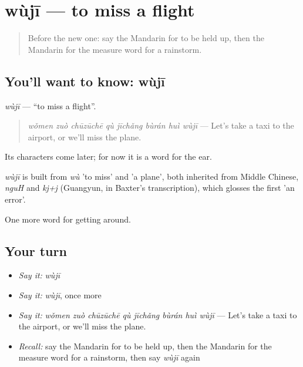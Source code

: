 \section[wùjī]{wùjī — to miss a flight}

\label{lesson:ZH-C416-wuji}



\begin{quote}
Before the new one: say the Mandarin for to be held up, then the Mandarin for the measure word for a rainstorm.
\end{quote}

\subsection*{You'll want to know: wùjī}
\emph{wùjī} — \textquotedblleft{}to miss a flight\textquotedblright{}.

\begin{quote}
\emph{wǒmen zuò chūzūchē qù jīchǎng bùrán huì wùjī} — Let's take a taxi to the airport, or we'll miss the plane.
\end{quote}

Its characters come later; for now it is a word for the ear.

\begin{cousinweb}
\emph{wùjī} is built from \emph{wù} 'to miss' and  'a plane', both inherited from Middle Chinese, \emph{nguH} and \emph{kj+j} (Guangyun, in Baxter's transcription), which glosses the first 'an error'.
\end{cousinweb}

\begin{grammarlens}[title={What you've built}]
One more word for getting around.
\end{grammarlens}

\subsection*{Your turn}
\begin{itemize}
\raggedright
  \item \emph{Say it:} \emph{wùjī}
  \item \emph{Say it:} \emph{wùjī}, once more
  \item \emph{Say it:} \emph{wǒmen zuò chūzūchē qù jīchǎng bùrán huì wùjī} — Let's take a taxi to the airport, or we'll miss the plane.
  \item \emph{Recall:} say the Mandarin for to be held up, then the Mandarin for the measure word for a rainstorm, then say \emph{wùjī} again
\end{itemize}

